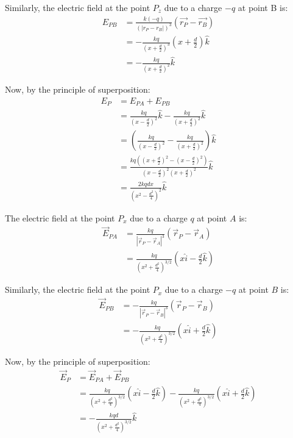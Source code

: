 \documentclass[a4paper,12pt]{article}
\begin{document}
Similarly, the electric field at the point $P_z$ due to a charge $-q$ at point B is:
\begin{align}
    E_{PB} &= \frac{k(-q)}{(|r_P - r_B|)^3} (\vec{r_P} - \vec{r_B}) \\
    &= -\frac{kq}{(x + \frac{d}{2})^3} (x + \frac{d}{2}) \hat{k} \\
    &= -\frac{kq}{(x + \frac{d}{2})^2} \hat{k}
\end{align}

Now, by the principle of superposition:
\begin{align}
    E_P &= E_{PA} + E_{PB} \\
        &= \frac{kq}{(x - \frac{d}{2})^2} \hat{k} - \frac{kq}{(x + \frac{d}{2})^2} \hat{k} \\
        &= \left( \frac{kq}{(x - \frac{d}{2})^2} - \frac{kq}{(x + \frac{d}{2})^2} \right) \hat{k} \\
        &= \frac{kq \left( (x + \frac{d}{2})^2 - (x - \frac{d}{2})^2 \right)}{(x - \frac{d}{2})^2 (x + \frac{d}{2})^2} \hat{k} \\
        &= \boxed{\frac{2kqdx}{(x^2 - \frac{d^2}{4})^2} \hat{k}}
\end{align}

The electric field at the point \( P_x \) due to a charge \( q \) at point \( A \) is:
\begin{align}
    \vec{E}_{PA} &= \frac{kq}{|\vec{r}_P - \vec{r}_A|^3} (\vec{r}_P - \vec{r}_A) \\
    &= \frac{kq}{(x^2 + \frac{d^2}{4})^{3/2}} \left( x \hat{i} - \frac{d}{2} \hat{k} \right)
\end{align}

Similarly, the electric field at the point \( P_x \) due to a charge \( -q \) at point \( B \) is:
\begin{align}
    \vec{E}_{PB} &= -\frac{kq}{|\vec{r}_P - \vec{r}_B|^3} (\vec{r}_P - \vec{r}_B) \\
    &= -\frac{kq}{(x^2 + \frac{d^2}{4})^{3/2}} \left( x \hat{i} + \frac{d}{2} \hat{k} \right)
\end{align}

Now, by the principle of superposition:
\begin{align}
    \vec{E}_P &= \vec{E}_{PA} + \vec{E}_{PB} \\
    &= \frac{kq}{(x^2 + \frac{d^2}{4})^{3/2}} \left( x \hat{i} - \frac{d}{2} \hat{k} \right) - \frac{kq}{(x^2 + \frac{d^2}{4})^{3/2}} \left( x \hat{i} + \frac{d}{2} \hat{k} \right) \\
    &= \boxed{-\frac{kqd}{(x^2 + \frac{d^2}{4})^{3/2}} \hat{k}}
\end{align}
\end{document}
